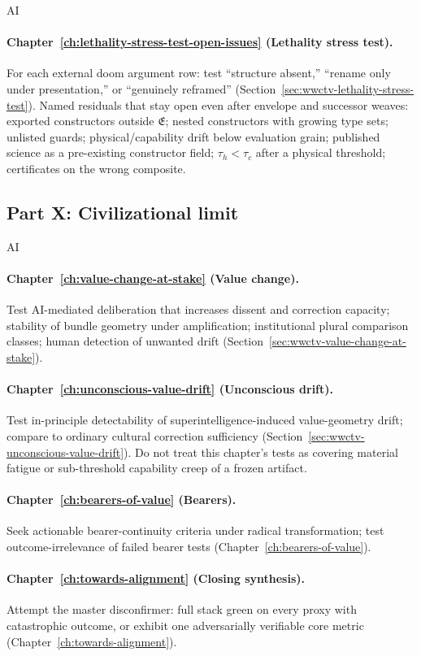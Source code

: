 \begin{authbar}{AI}
\paragraph{Chapter~\ref{ch:lethality-stress-test-open-issues} (Lethality stress test).}
For each external doom argument row: test ``structure absent,'' ``rename only under presentation,'' or ``genuinely reframed'' (Section~\ref{sec:wwctv-lethality-stress-test}).
Named residuals that stay open even after envelope and successor weaves: exported constructors outside \(\mathfrak{E}\); nested constructors with growing type sets; unlisted guards; physical/capability drift below evaluation grain; published science as a pre-existing constructor field; \(\tau_h<\tau_c\) after a physical threshold; certificates on the wrong composite.

\end{authbar}
\authbarsubneedspace
\subsection{Part X: Civilizational limit}
\begin{authbar}{AI}
\paragraph{Chapter~\ref{ch:value-change-at-stake} (Value change).}
Test AI-mediated deliberation that increases dissent and correction capacity; stability of bundle geometry under amplification; institutional plural comparison classes; human detection of unwanted drift (Section~\ref{sec:wwctv-value-change-at-stake}).

\paragraph{Chapter~\ref{ch:unconscious-value-drift} (Unconscious drift).}
Test in-principle detectability of superintelligence-induced value-geometry drift; compare to ordinary cultural correction sufficiency (Section~\ref{sec:wwctv-unconscious-value-drift}).
Do not treat this chapter's tests as covering material fatigue or sub-threshold capability creep of a frozen artifact.

\paragraph{Chapter~\ref{ch:bearers-of-value} (Bearers).}
Seek actionable bearer-continuity criteria under radical transformation; test outcome-irrelevance of failed bearer tests (Chapter~\ref{ch:bearers-of-value}).

\paragraph{Chapter~\ref{ch:towards-alignment} (Closing synthesis).}
Attempt the master disconfirmer: full stack green on every proxy with catastrophic outcome, or exhibit one adversarially verifiable core metric (Chapter~\ref{ch:towards-alignment}).

\end{authbar}
\authbarneedspace
